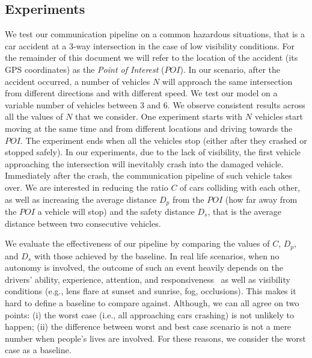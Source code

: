 \subsection{Experiments}
We test our communication pipeline on a common hazardous situations, that is a car accident at a 3-way
intersection in the case of low visibility conditions. For the remainder of this document we will refer to the location of
the accident (its GPS coordinates) as the \textit{Point of Interest} ($POI$).
In our scenario, after the accident occurred, a number of
vehicles $N$ will approach the same intersection from different directions and with different speed.
We test our model on a variable number of vehicles between $3$ and $6$. We observe consistent
results across all the values of $N$ that we consider.
One experiment starts with $N$ vehicles start moving at the same time and from different locations and
driving towards the $POI$. The experiment ends when all the vehicles stop (either after they crashed
or stopped safely).
In our experiments, due to the lack of visibility, the first vehicle approaching the intersection will inevitably crash
into the damaged vehicle. Immediately after the crash, the communication pipeline of such vehicle takes over.
We are interested in reducing the ratio $C$ of cars colliding with each other, as well as increasing
the average distance $D_p$ from the $POI$ (how far away from the $POI$ a vehicle will stop) and the safety
distance $D_s$, that is the average distance between two consecutive vehicles.

We evaluate the effectiveness of our pipeline by comparing the values of $C$, $D_p$, and $D_s$
with those achieved by the baseline.
In real life scenarios, when no autonomy is involved,
the outcome of such an event heavily depends on the drivers' ability, experience, attention, and
responsiveness~\cite{eby1995analysis} as well as visibility conditions (e.g., lens flare at sunset and
sunrise, fog, occlusions). This makes it hard to define
a baseline to compare against. Although, we can all agree on two points: (i) the worst case (i.e., all approaching
cars crashing) is not unlikely to happen; (ii) the difference between worst and best case scenario is not a mere
number when people's lives are involved. For these reasons, we consider the worst case as a baseline.

